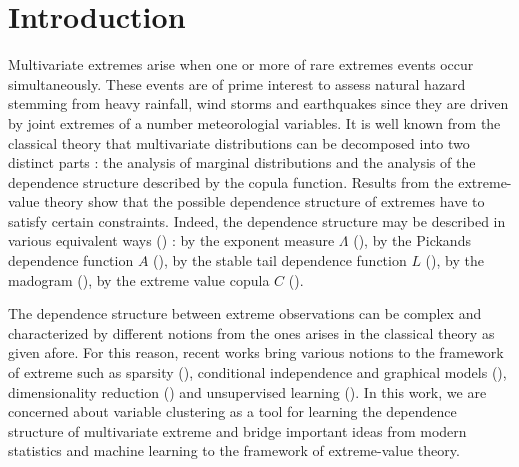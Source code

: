\documentclass[11pt]{article}
\begin{document}
	\section{Introduction}
	Multivariate extremes arise when one or more of rare extremes events occur simultaneously. These events are of prime interest to assess natural hazard stemming from heavy rainfall, wind storms and earthquakes since they are driven by joint extremes of a number meteorologial variables. It is well known from the classical theory that multivariate distributions can be decomposed into two distinct parts : the analysis of marginal distributions and the analysis of the dependence structure described by the copula function. Results from the extreme-value theory show that the possible dependence structure of extremes have to satisfy certain constraints. Indeed, the dependence structure may be described in various equivalent ways (\cite{resnick2008extreme, beirlant2004statistics, de2006extreme}) : by the exponent measure $\Lambda$ (\cite{balkema1977max}), by the Pickands dependence function $A$ (\cite{pickands1981multivariate}), by the stable tail dependence function $L$ (\cite{huang1992statistics}), by the madogram (\cite{naveau2009modelling}), by the extreme value copula $C$ (\cite{gudendorf2010}).
	
	The dependence structure between extreme observations can be complex and characterized by different notions from the ones arises in the classical theory as given afore. For this reason, recent works bring various notions to the framework of extreme such as sparsity (\cite{goix2015learning, simpson2020determining, meyer2021sparse}), conditional independence and graphical models (\cite{gissibl2018max, engelke2020graphical, segers2020one}), dimensionality reduction (\cite{chautru2015dimension, drees2021principal}) and unsupervised learning (\cite{cooley2019decompositions, janssen2020k}). In this work, we are concerned about variable clustering as a tool for learning the dependence structure of multivariate extreme and bridge important ideas from modern statistics and machine learning to the framework of extreme-value theory.
	
\end{document}

